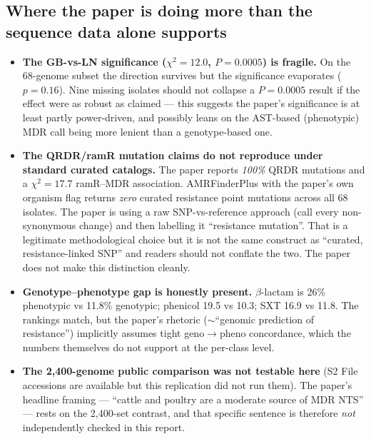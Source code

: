\documentclass[11pt]{article}
\begin{document}
\subsection*{Where the paper is doing more than the sequence data alone supports}
\begin{itemize}[leftmargin=*]
  \item \textbf{The GB-vs-LN significance ($\chi^2=12.0$, $P=0.0005$) is fragile.} On the 68-genome subset
        the direction survives but the significance evaporates ($p=0.16$). Nine missing isolates should not
        collapse a $P=0.0005$ result if the effect were as robust as claimed --- this suggests the paper's
        significance is at least partly power-driven, and possibly leans on the AST-based (phenotypic)
        MDR call being more lenient than a genotype-based one.
  \item \textbf{The QRDR/ramR mutation claims do not reproduce under standard curated catalogs.} The paper
        reports \emph{100\%} QRDR mutations and a $\chi^2=17.7$ ramR--MDR association. AMRFinderPlus with
        the paper's own organism flag returns \emph{zero} curated resistance point mutations across all 68
        isolates. The paper is using a raw SNP-vs-reference approach (call every non-synonymous change) and
        then labelling it ``resistance mutation''. That is a legitimate methodological choice but it is not
        the same construct as ``curated, resistance-linked SNP'' and readers should not conflate the two.
        The paper does not make this distinction cleanly.
  \item \textbf{Genotype--phenotype gap is honestly present.} $\beta$-lactam is 26\% phenotypic vs
        11.8\% genotypic; phenicol 19.5 vs 10.3; SXT 16.9 vs 11.8. The rankings match, but the paper's
        rhetoric ($\sim$``genomic prediction of resistance'') implicitly assumes tight geno$\to$pheno
        concordance, which the numbers themselves do not support at the per-class level.
  \item \textbf{The 2{,}400-genome public comparison was not testable here} (S2 File accessions are
        available but this replication did not run them). The paper's headline framing ---
        ``cattle and poultry are a moderate source of MDR NTS'' --- rests on the 2{,}400-set contrast, and
        that specific sentence is therefore \emph{not} independently checked in this report.
\end{itemize}
\end{document}
